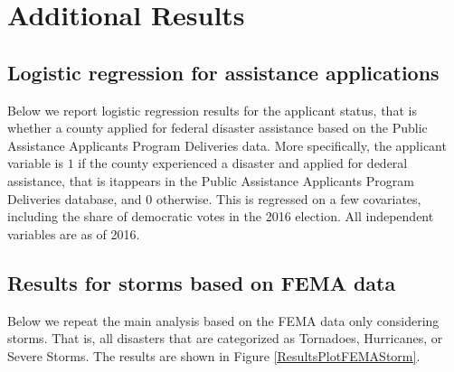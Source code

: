 
\section{Additional Results} \label{AppendixA}

\subsection{Logistic regression for assistance applications}

Below we report logistic regression results for the applicant status, that is whether a county applied for federal disaster assistance based on the Public Assistance Applicants Program Deliveries data. More specifically, the applicant variable is $1$ if the county experienced a disaster and applied for dederal assistance, that is itappears in the Public Assistance Applicants Program Deliveries database, and $0$ otherwise. This is regressed on a few covariates, including the share of democratic votes in the 2016 election. All independent variables are as of 2016.




\subsection{Results for storms based on FEMA data}

Below we repeat the main analysis based on the FEMA data only considering storms. That is, all disasters that are categorized as Tornadoes, Hurricanes, or Severe Storms. The results are shown in Figure \ref{ResultsPlotFEMAStorm}.

